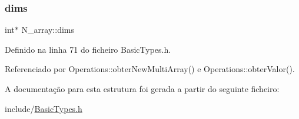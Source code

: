 \subsubsection{\texorpdfstring{dims}{dims}}
{\footnotesize\ttfamily int$\ast$ N\+\_\+array\+::dims}



Definido na linha 71 do ficheiro Basic\+Types.\+h.



Referenciado por Operations\+::obter\+New\+Multi\+Array() e Operations\+::obter\+Valor().



A documentação para esta estrutura foi gerada a partir do seguinte ficheiro\+:\begin{DoxyCompactItemize}
\item 
include/\hyperlink{BasicTypes_8h}{Basic\+Types.\+h}\end{DoxyCompactItemize}
